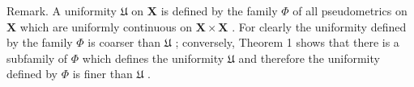 Remark. A uniformity \(\mathfrak{U}\) on \(\mathbf{X}\) is defined by the family \(\Phi\) of all pseudometrics on \(\mathbf{X}\) which are uniformly continuous on \(\mathbf{X} \times \mathbf{X}\) . For clearly the uniformity defined by the family \(\Phi\) is coarser than \(\mathfrak{U}\) ; conversely, Theorem 1 shows that there is a subfamily of \(\Phi\) which defines the uniformity \(\mathfrak{U}\) and therefore the uniformity defined by \(\Phi\) is finer than \(\mathfrak{U}\) .

